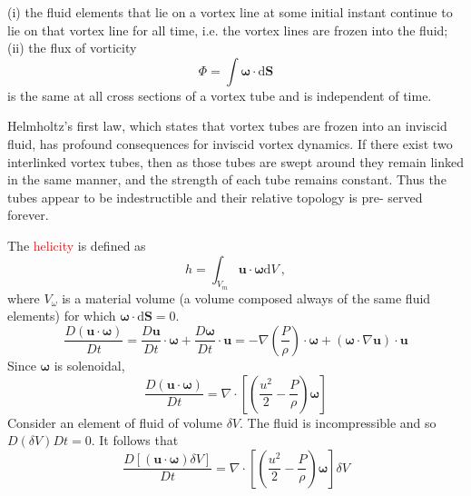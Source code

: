 \documentclass[12pt,a4paper]{article}
\renewcommand{\vec}[1]{\boldsymbol{#1}}
\newcommand{\dif}{\mathrm{d}}
\begin{document}
\begin{tcolorbox}[colback=green!15,colframe=green!40!black,title=Helmholtz's laws]
(i) the fluid elements that lie on a vortex line at some initial instant continue to lie on that vortex line for all time, i.e. the vortex lines are frozen into the fluid; \\
(ii) the flux of vorticity
\begin{equation}
\Phi = \int \vec{\omega} \cdot \dif \vec{S}
\end{equation}
is the same at all cross sections of a vortex tube and is independent of time.
\end{tcolorbox}

Helmholtz's first law, which states that vortex tubes are frozen into an inviscid fluid, has profound consequences for inviscid vortex dynamics. If there exist two interlinked vortex tubes, then as those tubes are swept around they remain linked in the same manner, and the strength of each tube remains constant. Thus the tubes appear to be indestructible and their relative topology is pre- served forever. 

The \textcolor{red}{helicity} is defined as
\begin{equation*}
h = \int_{V_m} \vec{u} \cdot \vec{\omega} \dif V ~,
\end{equation*}
where  $V_\omega$ is a material volume (a volume composed always of the same fluid elements) for which $\vec{\omega} \cdot \dif \vec{S} = 0$.
\begin{equation}
\frac{D (\vec{u}\cdot \vec{\omega}) }{D t} = \frac{D \vec{u} }{D t} \cdot \vec{\omega} + \frac{D \vec{\omega} }{D t} \cdot \vec{u} = -\nabla \left(\frac{P}{\rho} \right) \cdot \vec{\omega} +(\vec{\omega} \cdot \nabla \vec{u}) \cdot \vec{u}
\end{equation}
Since $\vec{\omega}$ is solenoidal, 
\begin{equation}
\frac{D (\vec{u}\cdot \vec{\omega}) }{D t} = \nabla \cdot \left[ \left(\frac{u^2}{2} -\frac{P}{\rho} \right)\vec{\omega} \right]
\end{equation}
Consider an element of fluid of volume $\delta V$. The fluid is incompressible and so $D(\delta V)Dt = 0$. It follows that
\begin{equation}
\frac{D [(\vec{u}\cdot \vec{\omega})\delta V] }{D t} = \nabla \cdot \left[ \left(\frac{u^2}{2} -\frac{P}{\rho} \right)\vec{\omega} \right] \delta V
\end{equation}
\end{document}
